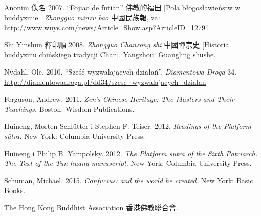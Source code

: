 Anonim 佚名 2007. ``Fojiao de futian'' 佛教的福田 [Pola błogosławieństw w buddyzmie]. \textit{Zhongguo minzu bao} 中國民族報, za: \url{http://www.wuys.com/news/Article_Show.asp?ArticleID=12791}

Shi Yinshun 釋印順 2008. \textit{Zhongguo Chanzong shi} 中國禪宗史 [Historia buddyzmu chińskiego tradycji Chan]. Yangzhou: Guangling shushe.

Nydahl, Ole. 2010. ``Sześć wyzwalających działań''. \textit{Diamentowa Droga} 34. \url{http://diamentowadroga.pl/dd34/szesc_wyzwalajacych_dzialan}

Ferguson, Andrew. 2011. \textit{Zen's Chinese Heritage: The Masters and Their Teachings.} Boston: Wisdom Publications.

Huineng, Morten Schlütter i Stephen F. Teiser. 2012. \textit{Readings of the Platform sūtra.} New York: Columbia University Press.%

Huineng i Philip B. Yampolsky. 2012. \textit{The Platform sutra of the Sixth Patriarch. The Text of the Tun-huang manuscript.} New York: Columbia University Press.%

Schuman, Michael. 2015. \textit{Confucius: and the world he created.} New York: Basic Books.

The Hong Kong Buddhist Association 香港佛教聯合會.
